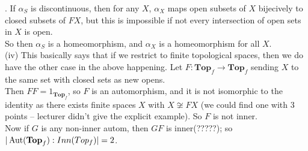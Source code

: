 \documentclass[a4paper]{article}
\begin{document}
. If $\alpha_S$ is discontinuous, then for any $X$, $\alpha_X$ maps open subsets of $X$ bijecively to closed subsets of $FX$, but this is impossible if not every intersection of open sets in $X$ is open.\\
So then $\alpha_S$ is a homeomorphism, and $\alpha_X$ is a homeomorphism for all $X$.\\
(iv) This basically says that if we restrict to finite topological spaces, then we do have the other case in the above happening. Let $F:\mathbf{Top}_f \to\mathbf{Top}_f$ sending $X$ to the same set with closed sets as new opens.\\
Then $FF = 1_{\mathbf{Top}_f}$, so $F$ is an automorphism, and it is not isomorphic to the identity as there exists finite spaces $X$ with $X \not\cong FX$ (we could find one with 3 points -- lecturer didn't give the explicit example). So $F$ is not inner.\\
Now if $G$ is any non-inner autom, then $GF$ is inner(?????); so $|\operatorname{Aut}(\mathbf{Top}_f):Inn(Top_f)| = 2$.
\end{document}
